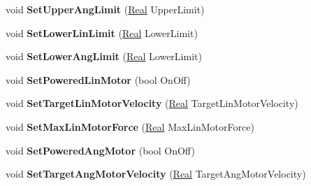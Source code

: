\begin{DoxyCompactItemize}
\item 
\hypertarget{classphys_1_1SliderConstraint_af441963a725b255ed34f5c82de7088a9}{
void {\bfseries SetUpperAngLimit} (\hyperlink{namespacephys_af7eb897198d265b8e868f45240230d5f}{Real} UpperLimit)}
\label{dc/d72/classphys_1_1SliderConstraint_af441963a725b255ed34f5c82de7088a9}

\item 
\hypertarget{classphys_1_1SliderConstraint_acf651cb8a31ca8730935a745a5555251}{
void {\bfseries SetLowerLinLimit} (\hyperlink{namespacephys_af7eb897198d265b8e868f45240230d5f}{Real} LowerLimit)}
\label{dc/d72/classphys_1_1SliderConstraint_acf651cb8a31ca8730935a745a5555251}

\item 
\hypertarget{classphys_1_1SliderConstraint_a4cbad2248429018961196e8aa91b89e8}{
void {\bfseries SetLowerAngLimit} (\hyperlink{namespacephys_af7eb897198d265b8e868f45240230d5f}{Real} LowerLimit)}
\label{dc/d72/classphys_1_1SliderConstraint_a4cbad2248429018961196e8aa91b89e8}

\item 
\hypertarget{classphys_1_1SliderConstraint_aca541af1afb9859f8991209533152e3c}{
void {\bfseries SetPoweredLinMotor} (bool OnOff)}
\label{dc/d72/classphys_1_1SliderConstraint_aca541af1afb9859f8991209533152e3c}

\item 
\hypertarget{classphys_1_1SliderConstraint_a74ab484d5989397a47de16b76b507e92}{
void {\bfseries SetTargetLinMotorVelocity} (\hyperlink{namespacephys_af7eb897198d265b8e868f45240230d5f}{Real} TargetLinMotorVelocity)}
\label{dc/d72/classphys_1_1SliderConstraint_a74ab484d5989397a47de16b76b507e92}

\item 
\hypertarget{classphys_1_1SliderConstraint_a958485ca8f1abd4e429583db42a909aa}{
void {\bfseries SetMaxLinMotorForce} (\hyperlink{namespacephys_af7eb897198d265b8e868f45240230d5f}{Real} MaxLinMotorForce)}
\label{dc/d72/classphys_1_1SliderConstraint_a958485ca8f1abd4e429583db42a909aa}

\item 
\hypertarget{classphys_1_1SliderConstraint_aafa81adee5bc78b4d435429e9ddcf538}{
void {\bfseries SetPoweredAngMotor} (bool OnOff)}
\label{dc/d72/classphys_1_1SliderConstraint_aafa81adee5bc78b4d435429e9ddcf538}

\item 
\hypertarget{classphys_1_1SliderConstraint_acad0aa3e9b3086956e45c5825570ec10}{
void {\bfseries SetTargetAngMotorVelocity} (\hyperlink{namespacephys_af7eb897198d265b8e868f45240230d5f}{Real} TargetAngMotorVelocity)}
\label{dc/d72/classphys_1_1SliderConstraint_acad0aa3e9b3086956e45c5825570ec10}


\end{DoxyCompactItemize}
